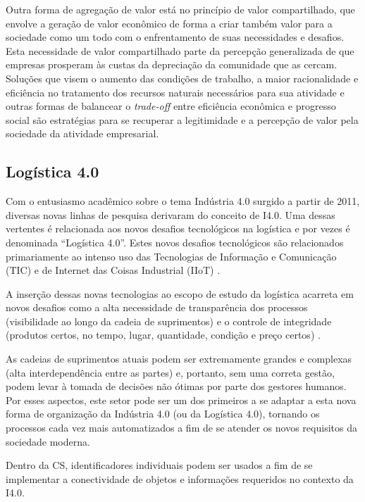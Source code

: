 Outra forma de agregação de valor está no princípio de valor compartilhado, que envolve a geração de valor econômico de forma a criar também valor para a sociedade como um todo \cite{porter2011valorcompartilhado} com o enfrentamento de suas necessidades e desafios. Esta necessidade de valor compartilhado parte da percepção generalizada de que empresas prosperam às custas da depreciação da comunidade que as cercam. Soluções que visem o aumento das condições de trabalho, a maior racionalidade e eficiência no tratamento dos recursos naturais necessários para sua atividade e outras formas de balancear o \textit{trade-off} entre eficiência econômica e progresso social são estratégias para se recuperar a legitimidade e a percepção de valor pela sociedade da atividade empresarial.

\subsection{Logística 4.0}

Com o entusiasmo acadêmico sobre o tema Indústria 4.0 surgido a partir de 2011, diversas novas linhas de pesquisa derivaram do conceito de I4.0. Uma dessas vertentes é relacionada aos novos desafios tecnológicos na logística e por vezes é denominada ``Logística 4.0''. Estes novos desafios tecnológicos são relacionados primariamente ao intenso uso das Tecnologias de Informação e Comunicação (TIC) e de Internet das Coisas Industrial (IIoT) \cite{barreto2017industry}.

A inserção dessas novas tecnologias ao escopo de estudo da logística acarreta em novos desafios como a alta necessidade de transparência dos processos (visibilidade ao longo da cadeia de suprimentos) e o controle de integridade (produtos certos, no tempo, lugar, quantidade, condição e preço certos) \cite{barreto2017industry}.

As cadeias de suprimentos atuais podem ser extremamente grandes e complexas (alta interdependência entre as partes) e, portanto, sem uma correta gestão, podem levar à tomada de decisões não ótimas por parte dos gestores humanos. Por esses aspectos, este setor pode ser um dos primeiros a se adaptar a esta nova forma de organização da Indústria 4.0 (ou da Logística 4.0), tornando os processos cada vez mais automatizados a fim de se atender os novos requisitos da sociedade moderna.

Dentro da CS, identificadores individuais podem ser usados a fim de se implementar a conectividade de objetos e informações requeridos no contexto da I4.0.

